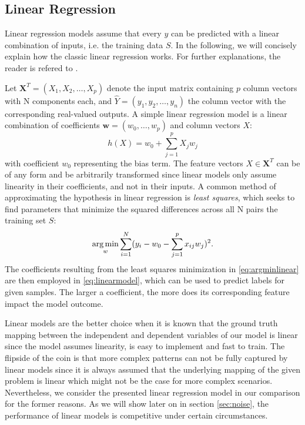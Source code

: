 \subsection{Linear Regression}

Linear regression models assume that every $ y $ can be predicted with a linear combination of inputs, i.e. the training data $ S $. In the following, we will concisely explain how the classic linear regression works. For further explanations, the reader is refered to \cite{friedman2001elements}.

Let $ \textbf{X}^{T} = (X_1, X_2, \dots, X_p) $ denote the input matrix containing $ p $ column vectors with N components each, and $ \hat{Y} = (y_1, y_2, \dots, y_n)$ the column vector with the corresponding real-valued outputs. A simple linear regression model is a linear combination of coefficients $ \mathbf{w} = (w_0, \dots, w_p) $ and column vectors $ X $:
\begin{equation}\label{eq:linearmodel}
h(X) = w_0 + \sum_{j=1}^{p} X_jw_j
\end{equation}
with coefficient $ w_0 $ representing the bias term. The feature vectors $ X \in \textbf{X}^{T} $ can be of any form and be arbitrarily transformed since linear models only assume linearity in their coefficients, and not in their inputs.
A common method of approximating the hypothesis in linear regression is \textit{least squares}, which seeks to find parameters that minimize the squared differences across all N pairs the training set $ S $:
\begin{equation}\label{eq:argminlinear}
\operatorname*{arg\,min}_{w} \sum_{i=1}^{N}(y_i - w_0 - \sum_{j=1}^{p} x_{ij}w_j)^2. 
\end{equation}
The coefficients resulting from the least squares minimization in \ref{eq:argminlinear} are then employed in \ref{eq:linearmodel}, which can be used to predict labels for given samples. The larger a coefficient, the more does its corresponding feature impact the model outcome. 

Linear models are the better choice when it is known that the ground truth mapping between the independent and dependent variables of our model is linear since the model assumes linearity, is easy to implement and fast to train. The flipside of the coin is that more complex patterns can not be fully captured by linear models since it is always assumed that the underlying mapping of the given problem is linear which might not be the case for more complex scenarios. Nevertheless, we consider the presented linear regression model in our comparison for the former reasons. As we will  show later on in section \ref{sec:noise}, the performance of linear models is competitive under certain circumstances.

